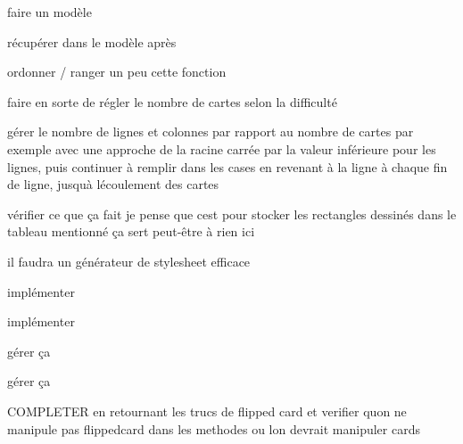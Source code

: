 
\begin{DoxyRefList}
\item[\label{todo__todo000005}%
\Hypertarget{todo__todo000005}%
Member \hyperlink{class_memory_a7c8b57775899a3782edcdf4da430ad61}{Memory\+:\+:get\+Nb\+Cards} (void)]faire un modèle 

récupérer dans le modèle après  
\item[\label{todo__todo000001}%
\Hypertarget{todo__todo000001}%
Member \hyperlink{class_memory_a243eef3e0fd8d02131e3bcca0471c931}{Memory\+:\+:Memory} (Q\+Widget $\ast$parent=0)]ordonner / ranger un peu cette fonction 

faire en sorte de régler le nombre de cartes selon la difficulté 

gérer le nombre de lignes et colonnes par rapport au nombre de cartes par exemple avec une approche de la racine carrée par la valeur inférieure pour les lignes, puis continuer à remplir dans les cases en revenant à la ligne à chaque fin de ligne, jusqu\textquotesingle{}à l\textquotesingle{}écoulement des cartes  
\item[\label{todo__todo000004}%
\Hypertarget{todo__todo000004}%
Member \hyperlink{class_memory_ad9a06b40d30c5ee3bbccacb37795255b}{Memory\+:\+:paint\+Event} (Q\+Paint\+Event $\ast$)]vérifier ce que ça fait je pense que c\textquotesingle{}est pour stocker les rectangles dessinés dans le tableau mentionné ça sert peut-\/être à rien ici  
\item[\label{todo__todo000007}%
\Hypertarget{todo__todo000007}%
Class \hyperlink{class_memory_index_cards}{Memory\+Index\+Cards} ]il faudra un générateur de stylesheet efficace  
\item[\label{todo__todo000008}%
\Hypertarget{todo__todo000008}%
Member \hyperlink{class_memory_index_cards_a10ae71958cd423edde68dc41dd010a66}{Memory\+Index\+Cards\+:\+:Memory\+Index\+Cards} (std\+::string \&pathcsv)]implémenter  
\item[\label{todo__todo000011}%
\Hypertarget{todo__todo000011}%
Member \hyperlink{class_mod_calcul_aa16185334bb48c8e312bd0b9148aa00d}{Mod\+Calcul\+:\+:get\+Ope1\+Str} (void)]implémenter  
\item[\label{todo__todo000010}%
\Hypertarget{todo__todo000010}%
Member \hyperlink{class_mod_calcul_ad6061decce032f0debf6fa79d153df5d}{Mod\+Calcul\+:\+:ini\+Set\+Operateurs} (pos\+Set\+Op set\+Op)]gérer ça 

gérer ça  
\item[\label{todo__todo000014}%
\Hypertarget{todo__todo000014}%
Member \hyperlink{class_mod_memory_a4e6581fef7b3adbad429bf4c39d38e88}{Mod\+Memory\+:\+:close\+Cards} (void)]C\+O\+M\+P\+L\+E\+T\+ER en retournant les trucs de flipped card et verifier qu\textquotesingle{}on ne manipule pas flippedcard dans les methodes ou l\textquotesingle{}on devrait manipuler cards


\end{DoxyRefList}
